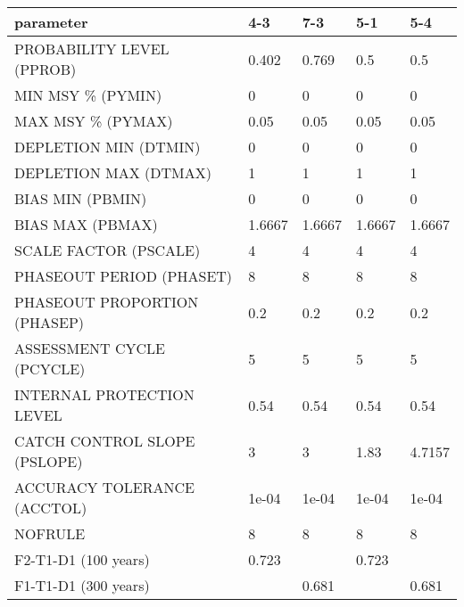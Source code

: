 \begin{table}[ht]
\centering
\begin{tabular}{lllll}
 parameter & 4-3 & 7-3 & 5-1 & 5-4 \\ 
  \hline
PROBABILITY LEVEL (PPROB)      & 0.402 & 0.769 & 0.5 & 0.5 \\ 
   \hline
MIN MSY \% (PYMIN)              & 0 & 0 & 0 & 0 \\ 
  MAX MSY \% (PYMAX)              & 0.05 & 0.05 & 0.05 & 0.05 \\ 
  DEPLETION MIN (DTMIN)          & 0 & 0 & 0 & 0 \\ 
  DEPLETION MAX (DTMAX)          & 1 & 1 & 1 & 1 \\ 
  BIAS MIN (PBMIN)               & 0 & 0 & 0 & 0 \\ 
  BIAS MAX (PBMAX)               & 1.6667 & 1.6667 & 1.6667 & 1.6667 \\ 
  SCALE FACTOR (PSCALE)          & 4 & 4 & 4 & 4 \\ 
  PHASEOUT PERIOD (PHASET)       & 8 & 8 & 8 & 8 \\ 
  PHASEOUT PROPORTION (PHASEP)   & 0.2 & 0.2 & 0.2 & 0.2 \\ 
  ASSESSMENT CYCLE (PCYCLE)      & 5 & 5 & 5 & 5 \\ 
  INTERNAL PROTECTION LEVEL      & 0.54 & 0.54 & 0.54 & 0.54 \\ 
  CATCH CONTROL SLOPE (PSLOPE)   & 3 & 3 & 1.83 & 4.7157 \\ 
  ACCURACY TOLERANCE (ACCTOL)    & 1e-04 & 1e-04 & 1e-04 & 1e-04 \\ 
  NOFRULE                        & 8 & 8 & 8 & 8 \\ 
  F2-T1-D1 (100 years) & 0.723 &  & 0.723 &  \\ 
  F1-T1-D1 (300 years) &  & 0.681 &  & 0.681 \\ 
   \hline
\end{tabular}
\end{table}
